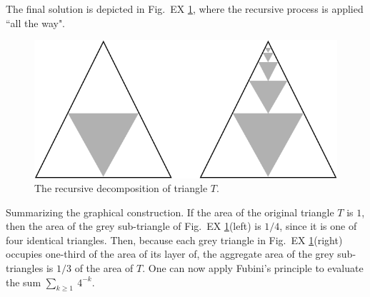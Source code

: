 \begin{itemize}
The final solution is depicted in Fig.~EX \ref{Fig:Sum1over4cascade}, where the recursive process is applied ``all the way". 
\begin{figure}
\begin{center}
        \includegraphics[scale=0.3]{FiguresMaths/Sum1over4cascade}
        \caption{The recursive decomposition of triangle $T$.}
        \label{Fig:Sum1over4cascade}
\end{center}
\end{figure}
Summarizing  the graphical construction.  If the area of the original triangle $T$ is $1$, then 
the area of the grey sub-triangle of Fig.~EX \ref{Fig:Sum1over4cascade}(left) is $1/4$, since it is one of four identical triangles.  Then, because each grey triangle in Fig.~EX \ref{Fig:Sum1over4cascade}(right) occupies one-third of the area of its layer of, the aggregate area of the grey sub-triangles is $1/3$ of the area of $T$.  One can now apply Fubini's principle to evaluate the sum $\sum_{k \geq 1} \ 4^{-k}$.
\end{itemize}

